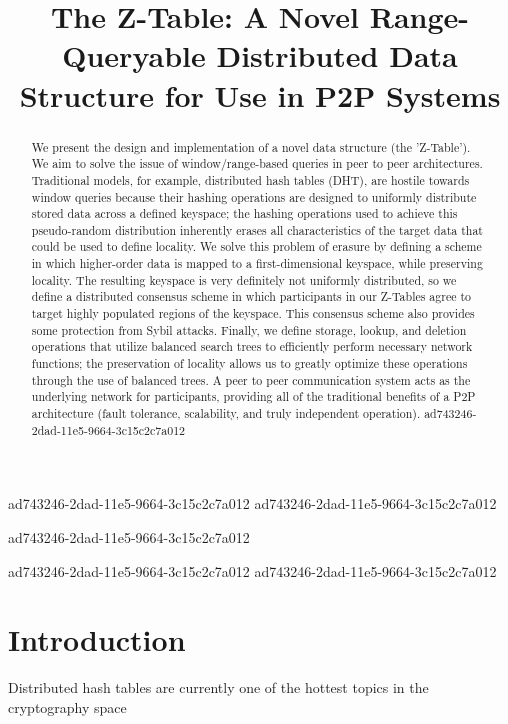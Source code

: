 \documentclass[12pt]{article}
\title{The Z-Table: A Novel Range-Queryable Distributed Data Structure for Use in P2P Systems}
\begin{document}
ad743246-2dad-11e5-9664-3c15c2c7a012
ad743246-2dad-11e5-9664-3c15c2c7a012\maketitle

ad743246-2dad-11e5-9664-3c15c2c7a012\begin{abstract}
We present the design and implementation of a novel data structure (the 'Z-Table'). We aim to solve the issue of window/range-based queries in peer to peer architectures. Traditional models, for example,  distributed hash tables (DHT), are hostile towards window queries because their hashing operations are designed to uniformly distribute stored data across a defined keyspace; the hashing operations used to achieve this pseudo-random distribution inherently erases all characteristics of the target data that could be used to define locality. We solve this problem of erasure by defining a scheme in which higher-order data is mapped to a first-dimensional keyspace, while preserving locality. The resulting keyspace is very definitely not uniformly distributed, so we define a distributed consensus scheme in which participants in our Z-Tables agree to target highly populated regions of the keyspace. This consensus scheme also provides some protection from Sybil attacks. Finally, we define storage, lookup, and deletion operations that utilize balanced search trees to efficiently perform necessary network functions; the preservation of locality allows us to greatly optimize these operations through the use of balanced trees. A peer to peer communication system acts as the underlying network for participants, providing all of the traditional benefits of a P2P architecture (fault tolerance, scalability, and truly independent operation).
ad743246-2dad-11e5-9664-3c15c2c7a012\end{abstract}


ad743246-2dad-11e5-9664-3c15c2c7a012\newpage
ad743246-2dad-11e5-9664-3c15c2c7a012\section{Introduction}
Distributed hash tables are currently one of the hottest topics in the cryptography space~\cite{Stoica:2001dj,Rowstron:2001ea,Ratnasamy:2001wn}

\printbibliography
\end{document}
